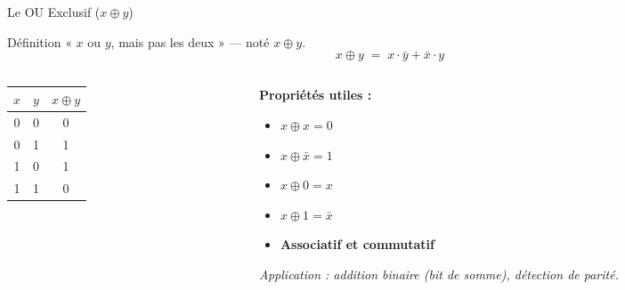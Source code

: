 \begin{frame}{Le OU Exclusif (\(x \oplus y\))}

    \begin{block}{Définition}
        « \(x\) ou \(y\), mais pas les deux » — noté \(x \oplus y\).
        \[
            x \oplus y \;=\; x \cdot \bar{y} + \bar{x} \cdot y
        \]
    \end{block}

    \vspace{0.4cm}

    \begin{columns}[T]
        \begin{column}{0.42\textwidth}
            \centering
            \begin{tabular}{|c|c|c|}
                \hline
                \(x\) & \(y\) & \(x \oplus y\) \\
                \hline
                0 & 0 & 0 \\
                0 & 1 & 1 \\
                1 & 0 & 1 \\
                1 & 1 & 0 \\
                \hline
            \end{tabular}
        \end{column}
        \begin{column}{0.55\textwidth}
            \textbf{Propriétés utiles :}
            \begin{itemize}
                \item \(x \oplus x = 0\)
                \item \(x \oplus \bar{x} = 1\)
                \item \(x \oplus 0 = x\)
                \item \(x \oplus 1 = \bar{x}\)
                \item \textbf{Associatif et commutatif}
            \end{itemize}

            \vspace{0.2cm}
            \textit{Application : addition binaire (bit de somme), détection de parité.}
        \end{column}
    \end{columns}

\end{frame}

